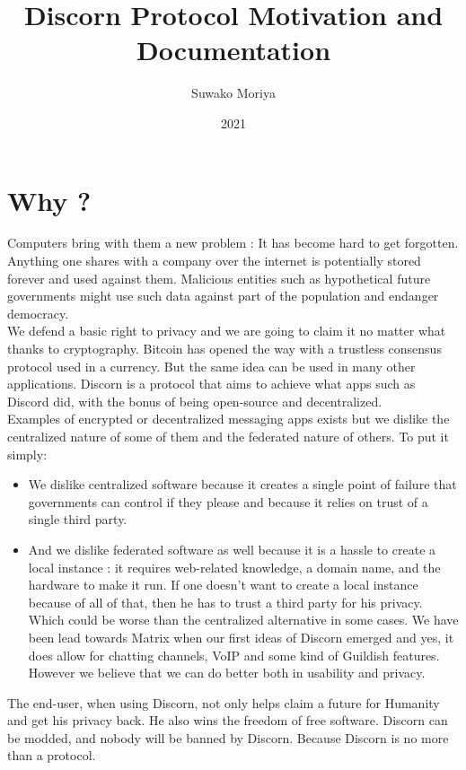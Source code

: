 \documentclass[a4paper,10pt]{article}
\title{Discorn Protocol Motivation and Documentation}
\author{Suwako Moriya}
\date{2021}
\begin{document}
    \maketitle
    \tableofcontents
    \section{Why ?}
        Computers bring with them a new problem : It has become hard to get forgotten.
        Anything one shares with a company over the internet is potentially stored forever and used against them.
        Malicious entities such as hypothetical future governments might use such data against part of the population
        and endanger democracy.\\
        
        We defend a basic right to privacy and we are going to claim it no matter what thanks to cryptography.
        Bitcoin has opened the way with a trustless consensus protocol used in a currency. But the same idea
        can be used in many other applications. Discorn is a protocol that aims to achieve what apps such as Discord did,
        with the bonus of being open-source and decentralized.\\
        
        
        Examples of encrypted or decentralized messaging apps exists but we dislike the centralized nature of some of them
        and the federated nature of others. To put it simply:
        \begin{itemize}
         \item We dislike centralized software because it creates a single point of failure that governments can control
         if they please and because it relies on trust of a single third party.
        
        \item And we dislike federated software as well because it is a hassle to create a local instance : it requires web-related
         knowledge, a domain name, and the hardware to make it run. If one doesn't want to create a local instance because of all of that,
         then he has to trust a third party for his privacy. Which could be worse than the centralized alternative in some cases.
         We have been lead towards Matrix when our first ideas of Discorn emerged and yes, it does allow for chatting channels, VoIP and some kind of Guildish features.
         However we believe that we can do better both in usability and privacy.
        \end{itemize}
        The end-user, when using Discorn, not only helps claim a future for Humanity and get his privacy back. He also wins the freedom
        of free software. Discorn can be modded, and nobody will be banned by Discorn. Because Discorn is no more than a protocol.
    
\end{document}
